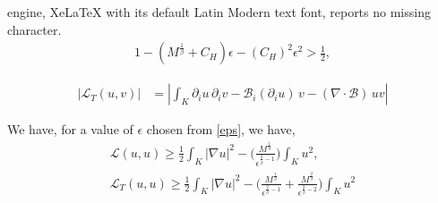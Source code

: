 \documentclass[10pt,a4paper]{amsart}
\newcommand{\eps}{\epsilon}
\begin{document}
engine, XeLaTeX with its default Latin Modern text font, reports no missing character.
\begin{align}\label{eps}
    1-(M^{\frac{1}{\beta}}+C_H)\eps -(C_H)^{2} \eps^2 >\frac{1}{2},
\end{align}

\begin{align}\label{eq23}
|\mathcal{L}_T(u,v)| &= \left| \int_K \partial_i u\, \partial_i v
- \mathcal{B}_i(\partial_i u)\,v - (\nabla \cdot \mathcal{B})\, uv \right|
\end{align}

\begin{theorem}\label{thm5}

We have, for a value of $\eps$ chosen from \cref{eps}, we have, 
\begin{align}   \mathcal{L}(u,u)\geq \frac{1}{2} \int_K |\nabla u|^2 -\Bigg( \frac{M^{\frac{1}{\beta}}}{\eps^{\frac{2}{\beta}-1}} \Bigg)  \int_{K} u^2 ,\\   \mathcal{L}_T(u,u)\geq \frac{1}{2} \int_K |\nabla u|^2 -\Big(  \frac{M^{\frac{1}{\beta}}}{\eps^{\frac{2}{\beta}-1}} + \frac{M^{\frac{2}{\beta}}}{{\eps^{\frac{2}{\beta}-2}}}  \Big)  \int_{K} u^2
\end{align}
\end{theorem}
\end{document}
